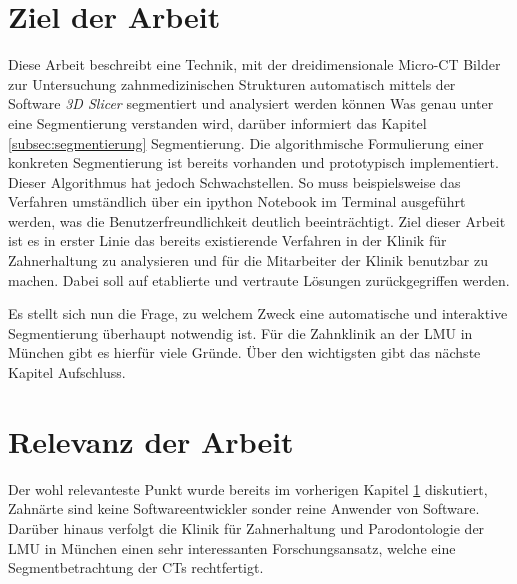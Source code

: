 \section{Ziel der Arbeit}
\label{sec:ziel_der_arbeit} Diese Arbeit beschreibt eine Technik, mit der
dreidimensionale Micro-CT Bilder zur Untersuchung zahnmedizinischen Strukturen
automatisch mittels der Software \textit{3D Slicer} segmentiert und analysiert werden
können Was genau unter eine Segmentierung verstanden wird, darüber informiert
das Kapitel \ref{subsec:segmentierung} Segmentierung. Die algorithmische Formulierung
einer konkreten Segmentierung ist bereits vorhanden und prototypisch implementiert.
Dieser Algorithmus hat jedoch Schwachstellen. So muss beispielsweise das Verfahren
umständlich über ein ipython Notebook im Terminal ausgeführt werden, was die
Benutzerfreundlichkeit deutlich beeinträchtigt. Ziel dieser Arbeit ist es in erster
Linie das bereits existierende Verfahren in der Klinik für Zahnerhaltung zu analysieren
und für die Mitarbeiter der Klinik benutzbar zu machen. Dabei soll auf
etablierte und vertraute Lösungen zurückgegriffen werden.

Es stellt sich nun die Frage, zu welchem Zweck eine automatische und interaktive
Segmentierung überhaupt notwendig ist. Für die Zahnklinik an der LMU in München
gibt es hierfür viele Gründe. Über den wichtigsten gibt das nächste Kapitel Aufschluss.

\section{Relevanz der Arbeit}
\label{sec:relevanz_der_arbeit} Der wohl relevanteste Punkt wurde bereits im vorherigen
Kapitel \ref{sec:ziel_der_arbeit} diskutiert, Zahnärte sind keine
Softwareentwickler sonder reine Anwender von Software. Darüber hinaus verfolgt die
Klinik für Zahnerhaltung und Parodontologie der LMU in München einen sehr interessanten
Forschungsansatz, welche eine Segmentbetrachtung der CTs rechtfertigt.

